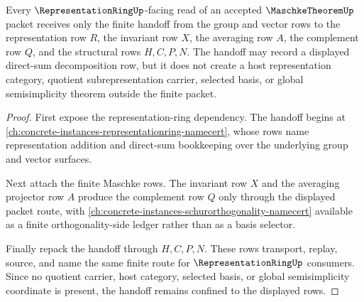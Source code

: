 \begin{theorem}
\label{thm:maschke-theorem-representation-ring-handoff}
Every $\RepresentationRingUp$-facing read of an accepted $\MaschkeTheoremUp$ packet receives only the finite handoff from the group and vector rows to the representation row $R$, the invariant row $X$, the averaging row $A$, the complement row $Q$, and the structural rows $H,C,P,N$. The handoff may record a displayed direct-sum decomposition row, but it does not create a host representation category, quotient subrepresentation carrier, selected basis, or global semisimplicity theorem outside the finite packet.
\end{theorem}
\begin{proof}
First expose the representation-ring dependency. The handoff begins at \autoref{ch:concrete-instances-representationring-namecert}, whose rows name representation addition and direct-sum bookkeeping over the underlying group and vector surfaces.

Next attach the finite Maschke rows. The invariant row $X$ and the averaging projector row $A$ produce the complement row $Q$ only through the displayed packet route, with \autoref{ch:concrete-instances-schurorthogonality-namecert} available as a finite orthogonality-side ledger rather than as a basis selector.

Finally repack the handoff through $H,C,P,N$. These rows transport, replay, source, and name the same finite route for $\RepresentationRingUp$ consumers. Since no quotient carrier, host category, selected basis, or global semisimplicity coordinate is present, the handoff remains confined to the displayed rows.
\end{proof}


\begin{closurestatus}{\MaschkeTheoremUp}
  \theoryclosure{\seedClosure}
  \formalstatus{\theoremCheckedV}
\end{closurestatus}
